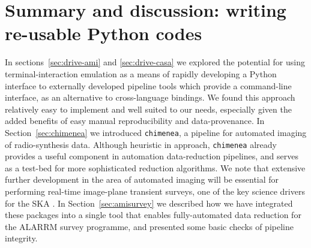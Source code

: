 \documentclass[5p,authoryear]{elsarticle}
\begin{document}
\section{Summary and discussion: writing re-usable Python codes}
\label{sec:conclusion}
In sections~\ref{sec:drive-ami} and \ref{sec:drive-casa} we explored the potential for using terminal-interaction emulation as a means of rapidly developing a Python interface to externally developed pipeline tools which provide a command-line interface, as an alternative to cross-language bindings. 
We found this approach relatively easy to implement and well suited to our needs, especially given the added benefits of easy manual reproducibility and data-provenance. 
In Section~\ref{sec:chimenea} we introduced \texttt{chimenea}, a pipeline for automated imaging of radio-synthesis data. 
Although heuristic in approach, \texttt{chimenea} already provides a useful component in automation data-reduction pipelines, and serves as a test-bed for more sophisticated reduction algorithms. 
We note that extensive further development in the area of automated imaging will be essential for performing real-time image-plane transient surveys, one of the key science drivers for the SKA \citep{Burlon2015,Corbel2015}.
In Section~\ref{sec:amisurvey} we described how we have integrated these packages into a single tool that enables fully-automated data reduction for the ALARRM survey programme, and presented some basic checks of pipeline integrity.
\end{document}
